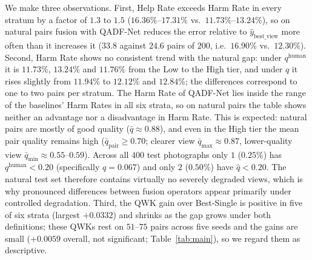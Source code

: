 \documentclass[final,5p,times,twocolumn,authoryear]{elsarticle}
\newcommand{\qadfnet}{QADF-Net}
\theoremstyle{plain}
\theoremstyle{remark}
\begin{document}
We make three observations. First, Help Rate exceeds Harm Rate in every stratum by a factor of $1.3$ to $1.5$ ($16.36\%$--$17.31\%$ vs.\ $11.73\%$--$13.24\%$), so on natural pairs fusion with \qadfnet{} reduces the error relative to $\hat{y}_{\text{best\_view}}$ more often than it increases it ($33.8$ against $24.6$ pairs of $200$, i.e.\ $16.90\%$ vs.\ $12.30\%$). Second, Harm Rate shows no consistent trend with the natural gap: under $q^{\text{human}}$ it is $11.73\%$, $13.24\%$ and $11.76\%$ from the Low to the High tier, and under $\hat{q}$ it rises slightly from $11.94\%$ to $12.12\%$ and $12.84\%$; the differences correspond to one to two pairs per stratum. The Harm Rate of \qadfnet{} lies inside the range of the baselines' Harm Rates in all six strata, so on natural pairs the table shows neither an advantage nor a disadvantage in Harm Rate. This is expected: natural pairs are mostly of good quality ($\bar{q} \approx 0.88$), and even in the High tier the mean pair quality remains high ($\bar{q}_{\text{pair}} \ge 0.70$; clearer view $\bar{q}_{\text{max}} \approx 0.87$, lower-quality view $\bar{q}_{\text{min}} \approx 0.55$--$0.59$). Across all $400$ test photographs only $1$ ($0.25\%$) has $q^{\text{human}} < 0.20$ (specifically $q = 0.067$) and only $2$ ($0.50\%$) have $\hat{q} < 0.20$. The natural test set therefore contains virtually no severely degraded views, which is why pronounced differences between fusion operators appear primarily under controlled degradation. Third, the QWK gain over Best-Single is positive in five of six strata (largest $+0.0332$) and shrinks as the gap grows under both definitions; these QWKs rest on $51$--$75$ pairs across five seeds and the gains are small ($+0.0059$ overall, not significant; Table~\ref{tab:main}), so we regard them as descriptive.
\end{document}
